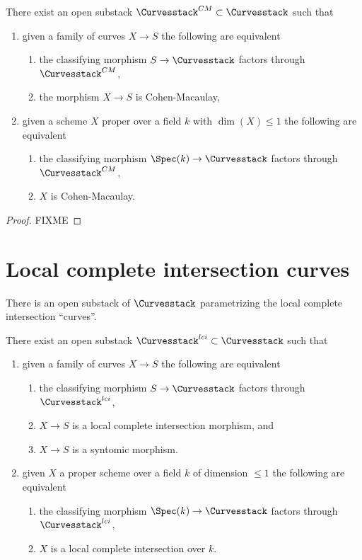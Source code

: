 \begin{lemma}
\label{lemma-CM-curves}
There exist an open substack $\Curvesstack^{CM} \subset \Curvesstack$
such that
\begin{enumerate}
\item given a family of curves $X \to S$ the following are equivalent
\begin{enumerate}
\item the classifying morphism $S \to \Curvesstack$ factors
through $\Curvesstack^{CM}$,
\item the morphism $X \to S$ is Cohen-Macaulay,
\end{enumerate}
\item given a scheme $X$ proper over a field $k$ with $\dim(X) \leq 1$
the following are equivalent
\begin{enumerate}
\item the classifying morphism $\Spec(k) \to \Curvesstack$ factors
through $\Curvesstack^{CM}$,
\item $X$ is Cohen-Macaulay.
\end{enumerate}
\end{enumerate}
\end{lemma}

\begin{proof}
FIXME
\end{proof}





\section{Local complete intersection curves}
\label{section-lci}

\noindent
There is an open substack of $\Curvesstack$ parametrizing
the local complete intersection ``curves''.

\begin{lemma}
\label{lemma-lci-curves}
There exist an open substack $\Curvesstack^{lci} \subset \Curvesstack$
such that
\begin{enumerate}
\item given a family of curves $X \to S$ the following are equivalent
\begin{enumerate}
\item the classifying morphism $S \to \Curvesstack$ factors through
$\Curvesstack^{lci}$,
\item $X \to S$ is a local complete intersection morphism, and
\item $X \to S$ is a syntomic morphism.
\end{enumerate}
\item given $X$ a proper scheme over a field $k$ of dimension $\leq 1$
the following are equivalent
\begin{enumerate}
\item the classifying morphism $\Spec(k) \to \Curvesstack$ factors
through $\Curvesstack^{lci}$,
\item $X$ is a local complete intersection over $k$.
\end{enumerate}
\end{enumerate}
\end{lemma}

